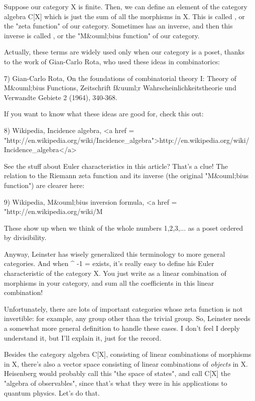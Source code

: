 Suppose our category X is finite.  Then, we can define an element of
the category algebra C[X] which is just the sum of all the morphisms
in X.  This is called \zeta , or the "zeta function" of our
category.  Sometimes \zeta  has an inverse, and then this inverse is
called \mu , or the "M&ouml;bius function" of our category.

Actually, these terms are widely used only when our category is a 
poset, thanks to the work of Gian-Carlo Rota, who used these ideas 
in combinatorics:

7) Gian-Carlo Rota, On the foundations of combinatorial theory I:
Theory of M&ouml;bius Functions, Zeitschrift f&uuml;r
Wahrscheinlichkeitstheorie und Verwandte Gebiete 2 (1964), 340-368.

If you want to know what these ideas are good for, check this out:

8) Wikipedia, Incidence algebra, 
<a href = "http://en.wikipedia.org/wiki/Incidence_algebra">http://en.wikipedia.org/wiki/Incidence_algebra</a>

See the stuff about Euler characteristics in this article?  That's a 
clue!  The relation to the Riemann zeta function and its inverse
(the original "M&ouml;bius function") are clearer here:

9) Wikipedia, M&ouml;bius inversion formula,
<a href = "http://en.wikipedia.org/wiki/M%

These show up when we think of the whole numbers 1,2,3,... as a poset 
ordered by divisibility.

Anyway, Leinster has wisely generalized this terminology to more
general categories.  And when \zeta ^{ -1} = \mu  exists, it's
really easy to define his Euler characteristic of the category X.  You
just write \mu  as a linear combination of morphisms in your category,
and sum all the coefficients in this linear combination!

Unfortunately, there are lots of important categories whose zeta
function is not invertible: for example, any group other than the
trivial group.  So, Leinster needs a somewhat more general definition
to handle these cases.  I don't feel I deeply understand it, but I'll
explain it, just for the record.

Besides the category algebra C[X], consisting of linear combinations
of morphisms in X, there's also a vector space consisting of linear
combinations of \emph{objects} in X.  Heisenberg would probably call
this "the space of states", and call C[X] the "algebra
of observables", since that's what they were in his applications
to quantum physics.  Let's do that.

